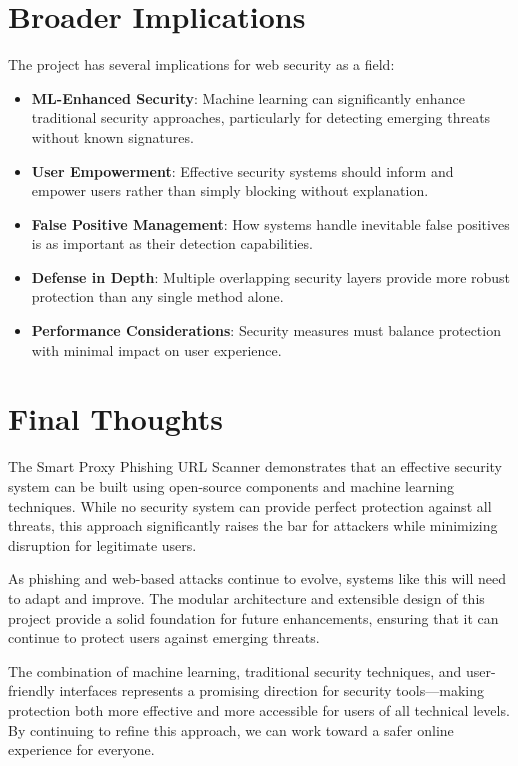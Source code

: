 \section{Broader Implications}

The project has several implications for web security as a field:

\begin{itemize}
    \item \textbf{ML-Enhanced Security}: Machine learning can significantly enhance traditional security approaches, particularly for detecting emerging threats without known signatures.
    
    \item \textbf{User Empowerment}: Effective security systems should inform and empower users rather than simply blocking without explanation.
    
    \item \textbf{False Positive Management}: How systems handle inevitable false positives is as important as their detection capabilities.
    
    \item \textbf{Defense in Depth}: Multiple overlapping security layers provide more robust protection than any single method alone.
    
    \item \textbf{Performance Considerations}: Security measures must balance protection with minimal impact on user experience.
\end{itemize}

\section{Final Thoughts}

The Smart Proxy Phishing URL Scanner demonstrates that an effective security system can be built using open-source components and machine learning techniques. While no security system can provide perfect protection against all threats, this approach significantly raises the bar for attackers while minimizing disruption for legitimate users.

As phishing and web-based attacks continue to evolve, systems like this will need to adapt and improve. The modular architecture and extensible design of this project provide a solid foundation for future enhancements, ensuring that it can continue to protect users against emerging threats.

The combination of machine learning, traditional security techniques, and user-friendly interfaces represents a promising direction for security tools—making protection both more effective and more accessible for users of all technical levels. By continuing to refine this approach, we can work toward a safer online experience for everyone.

